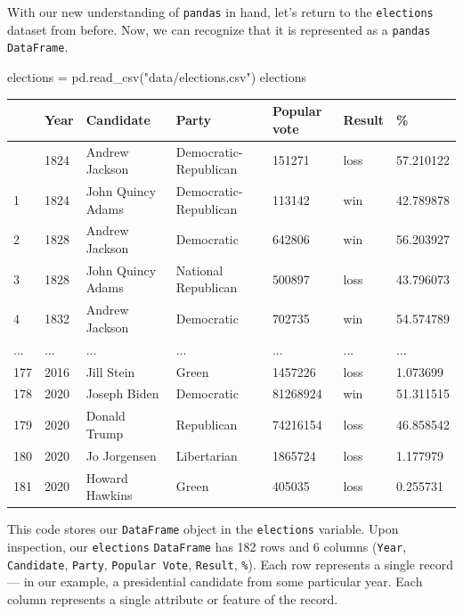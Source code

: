 \documentclass[
  letterpaper,
  DIV=11,
  numbers=noendperiod]{scrreprt}
\newenvironment{Shaded}{\begin{snugshade}}{\end{snugshade}}
\newcommand{\NormalTok}[1]{\textcolor[rgb]{0.00,0.23,0.31}{#1}}
\newcommand{\OperatorTok}[1]{\textcolor[rgb]{0.37,0.37,0.37}{#1}}
\newcommand{\StringTok}[1]{\textcolor[rgb]{0.13,0.47,0.30}{#1}}
\begin{document}
With our new understanding of \texttt{pandas} in hand, let's return to
the \texttt{elections} dataset from before. Now, we can recognize that
it is represented as a \texttt{pandas} \texttt{DataFrame}.

\begin{Shaded}
\begin{Highlighting}[]
\NormalTok{elections }\OperatorTok{=}\NormalTok{ pd.read\_csv(}\StringTok{"data/elections.csv"}\NormalTok{)}
\NormalTok{elections}
\end{Highlighting}
\end{Shaded}

\begin{longtable}[]{@{}lllllll@{}}
\toprule\noalign{}
& Year & Candidate & Party & Popular vote & Result & \% \\
\midrule\noalign{}
\endhead
\bottomrule\noalign{}
\endlastfoot
0 & 1824 & Andrew Jackson & Democratic-Republican & 151271 & loss &
57.210122 \\
1 & 1824 & John Quincy Adams & Democratic-Republican & 113142 & win &
42.789878 \\
2 & 1828 & Andrew Jackson & Democratic & 642806 & win & 56.203927 \\
3 & 1828 & John Quincy Adams & National Republican & 500897 & loss &
43.796073 \\
4 & 1832 & Andrew Jackson & Democratic & 702735 & win & 54.574789 \\
... & ... & ... & ... & ... & ... & ... \\
177 & 2016 & Jill Stein & Green & 1457226 & loss & 1.073699 \\
178 & 2020 & Joseph Biden & Democratic & 81268924 & win & 51.311515 \\
179 & 2020 & Donald Trump & Republican & 74216154 & loss & 46.858542 \\
180 & 2020 & Jo Jorgensen & Libertarian & 1865724 & loss & 1.177979 \\
181 & 2020 & Howard Hawkins & Green & 405035 & loss & 0.255731 \\
\end{longtable}

This code stores our \texttt{DataFrame} object in the \texttt{elections}
variable. Upon inspection, our \texttt{elections} \texttt{DataFrame} has
182 rows and 6 columns (\texttt{Year}, \texttt{Candidate},
\texttt{Party}, \texttt{Popular\ Vote}, \texttt{Result}, \texttt{\%}).
Each row represents a single record --- in our example, a presidential
candidate from some particular year. Each column represents a single
attribute or feature of the record.
\end{document}

